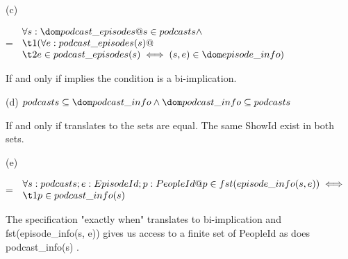 \documentclass[a4paper,10pt,fleqn]{article}
\begin{document}
\bigskip

\setlength{\leftskip}{0pt}
\medskip

\noindent\hspace*{\parindent}(c)

\setlength{\leftskip}{\dimexpr\parindent+2em\relax}
\savedleftskip=\leftskip
\noindent
$\displaystyle
\begin{array}{l}
\forall s : \dom podcast\_episodes @ s \in podcasts \land \\
\t1 (\forall e : podcast\_episodes(s) @ \\
\t2 e \in podcast\_episodes(s) \iff (s, e) \in \dom episode\_info)
\end{array}$

\bigskip


\bigskip

\setlength{\leftskip}{\dimexpr\parindent+2em\relax}
\noindent If and only if implies the condition is a bi-implication.

\bigskip

\newpage

\setlength{\leftskip}{0pt}
\medskip

\noindent\hspace*{\parindent}(d) $podcasts \subseteq \dom podcast\_info \land \dom podcast\_info \subseteq podcasts$

\bigskip

\setlength{\leftskip}{\dimexpr\parindent+2em\relax}
\noindent If and only if translates to the sets are equal. The same ShowId exist in both sets.

\bigskip

\setlength{\leftskip}{0pt}
\medskip

\noindent\hspace*{\parindent}(e)

\setlength{\leftskip}{\dimexpr\parindent+2em\relax}
\savedleftskip=\leftskip
\noindent
$\displaystyle
\begin{array}{l}
\forall s : podcasts; e : EpisodeId; p : PeopleId @ p \in fst(episode\_info(s, e)) \iff \\
\t1 p \in podcast\_info(s)
\end{array}$

\bigskip


\bigskip

\setlength{\leftskip}{\dimexpr\parindent+2em\relax}
\noindent The specification "exactly when" translates to bi-implication and fst(episode\_info(s, e)) gives us access to a finite set of PeopleId as does podcast\_info(s) .
\end{document}

